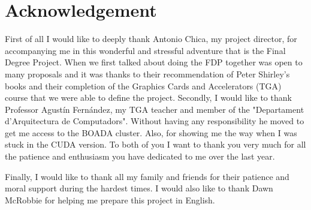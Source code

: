 \documentclass[titlepage,12pt]{report}
\begin{document}
\iftrue

\newpage
\thispagestyle{empty}
\section*{Acknowledgement}

First of all I would like to deeply thank Antonio Chica, my project director, for accompanying me in this wonderful and stressful adventure that is the Final Degree Project. When we first talked about doing the FDP together was open to many proposals and it was thanks to their recommendation of Peter Shirley's books and their completion of the Graphics Cards and Accelerators (TGA) course that we were able to define the project.  Secondly, I would like to thank Professor Agustín Fernández, my TGA teacher and member of the "Departament d'Arquitectura de Computadors". Without having any responsibility he moved to get me access to the BOADA cluster. Also, for showing me the way when I was stuck in the CUDA version. To both of you I want to thank you very much for all the patience and enthusiasm you have dedicated to me over the last year.

Finally, I would like to thank all my family and friends for their patience and moral support during the hardest times. I would also like to thank Dawn McRobbie for helping me prepare this project in English.
\end{document}
